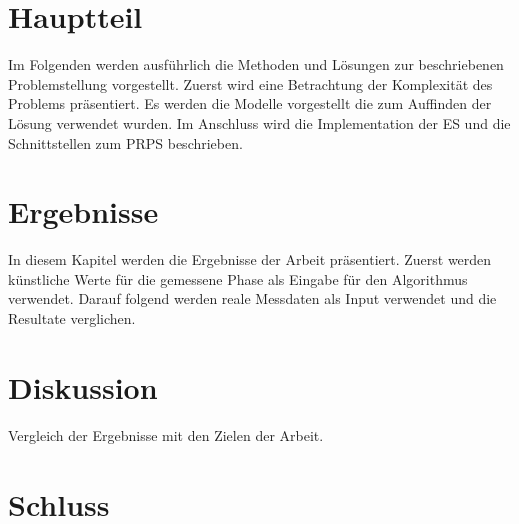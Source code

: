 \documentclass[a4paper,11pt, twoside, openright]{scrbook}
\begin{document}

%

\chapter{Hauptteil}
Im Folgenden werden ausführlich die Methoden und Lösungen zur beschriebenen Problemstellung vorgestellt. Zuerst wird eine Betrachtung der Komplexität des Problems präsentiert. Es werden die Modelle vorgestellt die zum Auffinden der Lösung verwendet wurden. Im Anschluss wird die Implementation der ES und die Schnittstellen zum PRPS beschrieben.
%

%
\chapter{Ergebnisse}
In diesem Kapitel werden die Ergebnisse der Arbeit präsentiert. Zuerst werden künstliche Werte für die gemessene Phase als Eingabe für den Algorithmus verwendet. Darauf folgend werden reale Messdaten als Input verwendet und die Resultate verglichen.\\
%

%
\chapter{Diskussion}
Vergleich der Ergebnisse mit den Zielen der Arbeit.\\
%

%
\chapter{Schluss}

%


\newpage



\end{document}
